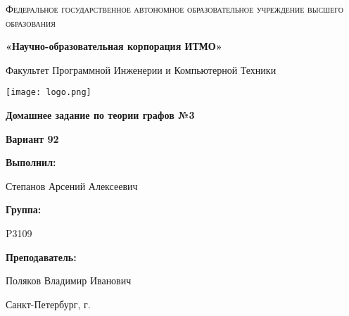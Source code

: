 \documentclass[12pt,a4paper]{report}
\begin{document}
\begin{titlepage} 
	\centering
	{
        \scshape
        Федеральное государственное автономное образовательное учреждение высшего образования
        \par
        \textbf{«Научно-образовательная корпорация ИТМО»}
        \par
        \vspace*{1cm}
        Факультет Программной Инженерии и Компьютерной Техники
        \par
    }
    \vspace*{0.6cm}
    \texttt{[image: logo.png]}
    {
        \Large
        \textbf{Домашнее задание по теории графов №3}
        \par
        \normalsize
        \vspace*{0.75cm}
        \textbf{Вариант 92}
        \par
    }
    \vfill
    \hfill\begin{minipage}{\dimexpr\textwidth-7.8cm}
        \textbf{Выполнил:}\par
        Степанов Арсений Алексеевич\par
        \vspace*{0.15cm}
        \textbf{Группа:}\par
        P3109\par
        \vspace*{0.15cm}
        \textbf{Преподаватель:}\par
        Поляков Владимир Иванович\par
    \end{minipage}
    \vfill
    Санкт-Петербург, \the\year{}г.
\end{titlepage}  
\onehalfspacing
\end{document}
